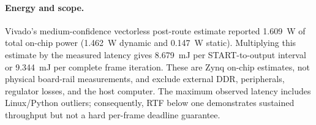 \paragraph{Energy and scope.}
Vivado's medium-confidence vectorless post-route estimate reported 1.609~W of
total on-chip power (1.462~W dynamic and 0.147~W static).  Multiplying this
estimate by the measured latency gives 8.679~mJ per START-to-output interval or
9.344~mJ per complete frame iteration.  These are Zynq on-chip estimates, not
physical board-rail measurements, and exclude external DDR, peripherals,
regulator losses, and the host computer.  The maximum observed latency includes
Linux/Python outliers; consequently, RTF below one demonstrates sustained
throughput but not a hard per-frame deadline guarantee.
